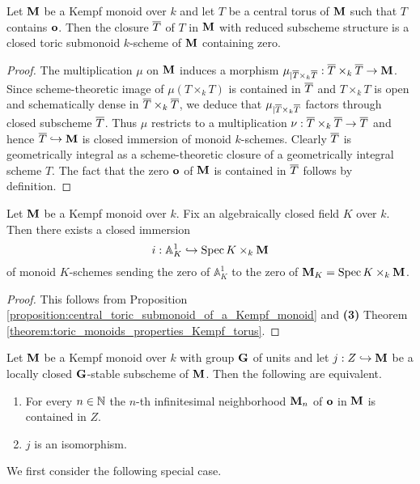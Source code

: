 \begin{proposition}\label{proposition:central_toric_submonoid_of_a_Kempf_monoid}
Let $\mathbf{M}$ be a Kempf monoid over $k$ and let $T$ be a central torus of $\mathbf{M}$ such that $T$ contains $\mathbf{o}$. Then the closure $\overline{T}$ of $T$ in $\mathbf{M}$ with reduced subscheme structure is a closed toric submonoid $k$-scheme of $\mathbf{M}$ containing zero.
\end{proposition}
\begin{proof}
The multiplication $\mu$ on $\mathbf{M}$ induces a morphism $\mu_{\mid \overline{T}\times_k\overline{T}}:\overline{T}\times_k\overline{T}\rightarrow \mathbf{M}$. Since scheme-theoretic image of $\mu(T\times_kT)$ is contained in $\overline{T}$ and $T\times_kT$ is open and schematically dense in $\overline{T}\times_k\overline{T}$, we deduce that $\mu_{\mid \overline{T}\times_k\overline{T}}$ factors through closed subscheme $\overline{T}$. Thus $\mu$ restricts to a multiplication $\nu:\overline{T}\times_k\overline{T}\rightarrow \overline{T}$ and hence $\overline{T}\hookrightarrow \mathbf{M}$ is closed immersion of monoid $k$-schemes. Clearly $\overline{T}$ is geometrically integral as a scheme-theoretic closure of a geometrically integral scheme $T$. The fact that the zero $\mathbf{o}$ of $\mathbf{M}$ is contained in $\overline{T}$ follows by definition.
\end{proof}

\begin{corollary}\label{corollary:Kempf_one_parameter_subgroup}
Let $\mathbf{M}$ be a Kempf monoid over $k$. Fix an algebraically closed field $K$ over $k$. Then there exists a closed immersion
$$i:\mathbb{A}^1_K \hookrightarrow \mathrm{Spec}\, K\times_k\mathbf{M}$$
of monoid $K$-schemes sending the zero of $\mathbb{A}^1_K$ to the zero of $\mathbf{M}_K = \mathrm{Spec}\, K\times_k\mathbf{M}$.
\end{corollary}
\begin{proof}
This follows from Proposition \ref{proposition:central_toric_submonoid_of_a_Kempf_monoid} and \textbf{(3)} Theorem \ref{theorem:toric_monoids_properties_Kempf_torus}.
\end{proof}

\begin{theorem}\label{theorem:if_locally_closed_group_stable_subscheme_of_kempf_monoid_contains_infinitesimal_neighborhood_of_zero_then_it_is_whole_monoid}
Let $\mathbf{M}$ be a Kempf monoid over $k$ with group $\mathbf{G}$ of units and let $j:Z\hookrightarrow \mathbf{M}$ be a locally closed $\mathbf{G}$-stable subscheme of $\mathbf{M}$. Then the following are equivalent.
\begin{enumerate}[label=\textbf{\emph{(\roman*)}}, leftmargin=3.0em]
\item For every $n\in {\mathbb N}$ the $n$-th infinitesimal neighborhood $\mathbf{M}_n$ of $\mathbf{o}$ in $\mathbf{M}$ is contained in $Z$.
\item $j$ is an isomorphism.
\end{enumerate}
\end{theorem}
\noindent
We first consider the following special case.

